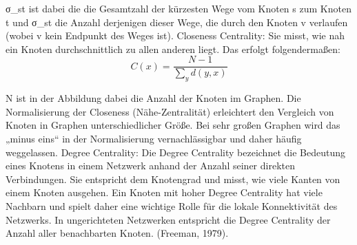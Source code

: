 σ_st ist dabei die die Gesamtzahl der kürzesten Wege vom Knoten s zum Knoten t und σ_st die Anzahl derjenigen dieser Wege, die durch den Knoten v verlaufen (wobei v kein Endpunkt des Weges ist).
	Closeness Centrality: Sie misst, wie nah ein Knoten durchschnittlich zu allen anderen liegt. Das erfolgt folgendermaßen: 
\[
C(x) = \frac{N - 1}{\sum_{y} d(y, x)}
\]

N ist in der Abbildung dabei die Anzahl der Knoten im Graphen. Die Normalisierung der Closeness (Nähe-Zentralität) erleichtert den Vergleich von Knoten in Graphen unterschiedlicher Größe. Bei sehr großen Graphen wird das „minus eins“ in der Normalisierung vernachlässigbar und daher häufig weggelassen.
	Degree Centrality: Die Degree Centrality bezeichnet die Bedeutung eines Knotens in einem Netzwerk anhand der Anzahl seiner direkten Verbindungen. Sie entspricht dem Knotengrad und misst, wie viele Kanten von einem Knoten ausgehen. Ein Knoten mit hoher Degree Centrality hat viele Nachbarn und spielt daher eine wichtige Rolle für die lokale Konnektivität des Netzwerks. In ungerichteten Netzwerken entspricht die Degree Centrality der Anzahl aller benachbarten Knoten. (Freeman, 1979).
